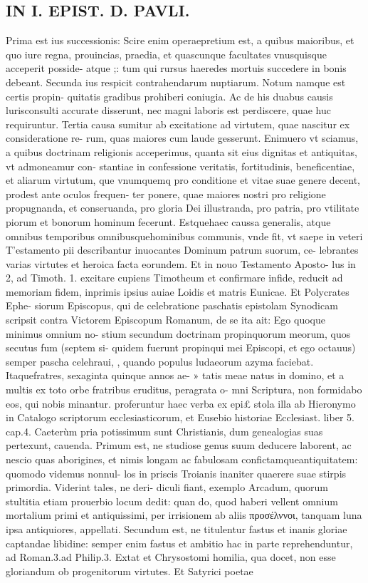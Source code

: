 \documentclass{article}
\begin{document}
\begin{pages}
\section*{IN I. EPIST. D. PAVLI. }
\marginpar{[ p.15 ]}\pstart Prima est ius successionis: Scire enim operaepretium est, a quibus maioribus, et quo iure regna, prouincias, praedia, et quascunque  facultates vnusquisque  acceperit posside- atque ;: tum qui rursus haeredes mortuis succedere in bonis debeant.  \pend\pstart Secunda ius respicit contrahendarum nuptiarum. Notum namque  est certis propin- quitatis gradibus prohiberi coniugia. Ac de his duabus causis lurisconsulti accurate disserunt, nec magni laboris est perdiscere, quae huc requiruntur.  \pend\pstart Tertia causa sumitur ab excitatione ad virtutem, quae nascitur ex consideratione re- rum, quas maiores cum laude gesserunt. Enimuero vt sciamus, a quibus doctrinam religionis acceperimus, quanta sit eius dignitas et antiquitas, vt admoneamur con- stantiae in confessione veritatis, fortitudinis, beneficentiae, et aliarum virtutum, que vnumquemq pro conditione et vitae suae genere decent, prodest ante oculos frequen- ter ponere, quae maiores nostri pro religione propugnanda, et conseruanda, pro gloria Dei illustranda, pro patria, pro vtilitate piorum et bonorum hominum fecerunt. Estquehaec caussa generalis, atque  omnibus temporibus omnibusquehominibus communis, vnde fit, vt saepe in veteri T’estamento pii describantur inuocantes Dominum patrum suorum, ce- lebrantes varias virtutes et heroica facta eorundem. Et in nouo Testamento Aposto- lus in 2, ad Timoth. 1. excitare cupiens Timotheum et confirmare infide, reducit ad memoriam fidem, inprimis ipsius auiae Loidis et matris Eunicae. Et Polycrates Ephe- siorum Episcopus, qui de celebratione paschatis epistolam Synodicam scripsit contra Victorem Episcopum Romanum, de se ita ait: Ego quoque minimus omnium no-   stium secundum doctrinam propinquorum meorum, quos secutus fum (septem si-   quidem fuerunt propinqui mei Episcopi, et ego octauus) semper pascha celehraui, , quando populus ludaeorum azyma faciebat. Itaquefratres, sexaginta quinque  annos ae- » tatis meae natus in domino, et a multis ex toto orbe fratribus eruditus, peragrata o-   mni Scriptura, non formidabo eos, qui nobis minantur. proferuntur haec verba ex epi£ stola illa ab Hieronymo in Catalogo scriptorum ecclesiasticorum, et Eusebio historiae Ecclesiast. liber 5. cap.4.  \pend\pstart Caeterùm pria potissimum sunt Christianis, dum genealogias suas pertexunt, cauenda. Primum est, ne studiose genus suum deducere laborent, ac nescio quas aborigines, et nimis longam ac fabulosam confictamqueantiquitatem: quomodo videmus nonnul- los in priscis Troianis inaniter quaerere suae stirpis primordia. Viderint tales, ne deri- diculi fiant, exemplo Arcadum, quorum stultitia etiam prouerbio locum dedit: quan do, quod haberi vellent omnium mortalium primi et antiquissimi, per irrisionem ab aliis προσέλννοι, tanquam luna ipsa antiquiores, appellati. Secundum est, ne titulentur fastus et inanis gloriae captandae libidine: semper enim fastus et ambitio hac in parte reprehenduntur, ad Roman.3.ad Philip.3. Extat et Chrysostomi homilia, qua docet, non esse gloriandum ob progenitorum virtutes. Et Satyrici poetae 
\end{pages}
\end{document}

